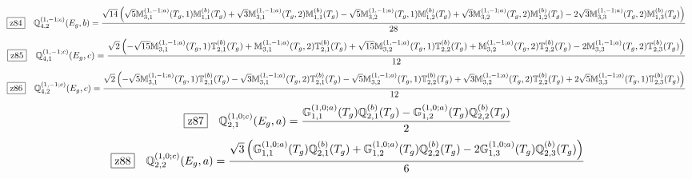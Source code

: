 \documentclass[fleqn,10pt,landscape]{jsarticle}
\begin{document}
\begin{dmath*}
\hspace*{3mm}\fbox{z84}\quad \mathbb{Q}_{4,2}^{(1,-1;c)}(E_{g},b)=\frac{\sqrt{14} \left(\sqrt{5} \mathbb{M}_{3,1}^{(1,-1;a)}(T_{g},1) \mathbb{M}_{1,1}^{(b)}(T_{g}) + \sqrt{3} \mathbb{M}_{3,1}^{(1,-1;a)}(T_{g},2) \mathbb{M}_{1,1}^{(b)}(T_{g}) - \sqrt{5} \mathbb{M}_{3,2}^{(1,-1;a)}(T_{g},1) \mathbb{M}_{1,2}^{(b)}(T_{g}) + \sqrt{3} \mathbb{M}_{3,2}^{(1,-1;a)}(T_{g},2) \mathbb{M}_{1,2}^{(b)}(T_{g}) - 2 \sqrt{3} \mathbb{M}_{3,3}^{(1,-1;a)}(T_{g},2) \mathbb{M}_{1,3}^{(b)}(T_{g})\right)}{28}
\end{dmath*}
\begin{dmath*}
\hspace*{3mm}\fbox{z85}\quad \mathbb{Q}_{4,1}^{(1,-1;c)}(E_{g},c)=\frac{\sqrt{2} \left(- \sqrt{15} \mathbb{M}_{3,1}^{(1,-1;a)}(T_{g},1) \mathbb{T}_{2,1}^{(b)}(T_{g}) + \mathbb{M}_{3,1}^{(1,-1;a)}(T_{g},2) \mathbb{T}_{2,1}^{(b)}(T_{g}) + \sqrt{15} \mathbb{M}_{3,2}^{(1,-1;a)}(T_{g},1) \mathbb{T}_{2,2}^{(b)}(T_{g}) + \mathbb{M}_{3,2}^{(1,-1;a)}(T_{g},2) \mathbb{T}_{2,2}^{(b)}(T_{g}) - 2 \mathbb{M}_{3,3}^{(1,-1;a)}(T_{g},2) \mathbb{T}_{2,3}^{(b)}(T_{g})\right)}{12}
\end{dmath*}
\begin{dmath*}
\hspace*{3mm}\fbox{z86}\quad \mathbb{Q}_{4,2}^{(1,-1;c)}(E_{g},c)=\frac{\sqrt{2} \left(- \sqrt{5} \mathbb{M}_{3,1}^{(1,-1;a)}(T_{g},1) \mathbb{T}_{2,1}^{(b)}(T_{g}) - \sqrt{3} \mathbb{M}_{3,1}^{(1,-1;a)}(T_{g},2) \mathbb{T}_{2,1}^{(b)}(T_{g}) - \sqrt{5} \mathbb{M}_{3,2}^{(1,-1;a)}(T_{g},1) \mathbb{T}_{2,2}^{(b)}(T_{g}) + \sqrt{3} \mathbb{M}_{3,2}^{(1,-1;a)}(T_{g},2) \mathbb{T}_{2,2}^{(b)}(T_{g}) + 2 \sqrt{5} \mathbb{M}_{3,3}^{(1,-1;a)}(T_{g},1) \mathbb{T}_{2,3}^{(b)}(T_{g})\right)}{12}
\end{dmath*}
\begin{dmath*}
\hspace*{3mm}\fbox{z87}\quad \mathbb{Q}_{2,1}^{(1,0;c)}(E_{g},a)=\frac{\mathbb{G}_{1,1}^{(1,0;a)}(T_{g}) \mathbb{Q}_{2,1}^{(b)}(T_{g}) - \mathbb{G}_{1,2}^{(1,0;a)}(T_{g}) \mathbb{Q}_{2,2}^{(b)}(T_{g})}{2}
\end{dmath*}
\begin{dmath*}
\hspace*{3mm}\fbox{z88}\quad \mathbb{Q}_{2,2}^{(1,0;c)}(E_{g},a)=\frac{\sqrt{3} \left(\mathbb{G}_{1,1}^{(1,0;a)}(T_{g}) \mathbb{Q}_{2,1}^{(b)}(T_{g}) + \mathbb{G}_{1,2}^{(1,0;a)}(T_{g}) \mathbb{Q}_{2,2}^{(b)}(T_{g}) - 2 \mathbb{G}_{1,3}^{(1,0;a)}(T_{g}) \mathbb{Q}_{2,3}^{(b)}(T_{g})\right)}{6}
\end{dmath*}
\end{document}
